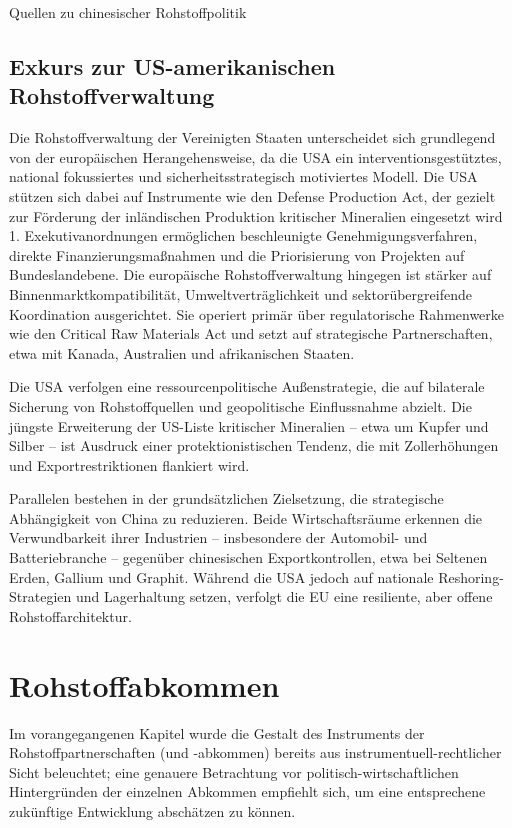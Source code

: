 \documentclass[12pt,a4paper,oneside]{book} %
\begin{document}
Quellen zu chinesischer Rohstoffpolitik

\subsection{Exkurs zur US-amerikanischen Rohstoffverwaltung}
Die Rohstoffverwaltung der Vereinigten Staaten unterscheidet sich grundlegend von der europäischen Herangehensweise, da die USA ein interventionsgestütztes, national fokussiertes und sicherheitsstrategisch motiviertes Modell. Die USA stützen sich dabei auf Instrumente wie den Defense Production Act, der gezielt zur Förderung der inländischen Produktion kritischer Mineralien eingesetzt wird 1. Exekutivanordnungen ermöglichen beschleunigte Genehmigungsverfahren, direkte Finanzierungsmaßnahmen und die Priorisierung von Projekten auf Bundeslandebene. Die europäische Rohstoffverwaltung hingegen ist stärker auf Binnenmarktkompatibilität, Umweltverträglichkeit und sektorübergreifende Koordination ausgerichtet. Sie operiert primär über regulatorische Rahmenwerke wie den Critical Raw Materials Act und setzt auf strategische Partnerschaften, etwa mit Kanada, Australien und afrikanischen Staaten.

Die USA verfolgen eine ressourcenpolitische Außenstrategie, die auf bilaterale Sicherung von Rohstoffquellen und geopolitische Einflussnahme abzielt. Die jüngste Erweiterung der US-Liste kritischer Mineralien – etwa um Kupfer und Silber – ist Ausdruck einer protektionistischen Tendenz, die mit Zollerhöhungen und Exportrestriktionen flankiert wird.

Parallelen bestehen in der grundsätzlichen Zielsetzung, die strategische Abhängigkeit von China zu reduzieren. Beide Wirtschaftsräume erkennen die Verwundbarkeit ihrer Industrien – insbesondere der Automobil- und Batteriebranche – gegenüber chinesischen Exportkontrollen, etwa bei Seltenen Erden, Gallium und Graphit. Während die USA jedoch auf nationale Reshoring-Strategien und Lagerhaltung setzen, verfolgt die EU eine resiliente, aber offene Rohstoffarchitektur.



\section{Rohstoffabkommen}
Im vorangegangenen Kapitel wurde die Gestalt des Instruments der Rohstoffpartnerschaften (und -abkommen) bereits aus instrumentuell-rechtlicher Sicht beleuchtet; eine genauere Betrachtung vor politisch-wirtschaftlichen Hintergründen der einzelnen Abkommen empfiehlt sich, um eine entsprechene zukünftige Entwicklung abschätzen zu können.
\end{document}
